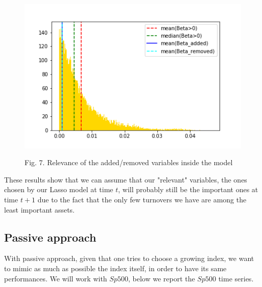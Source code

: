 \documentclass{article}%
\begin{document}
\begin{figure}[h!]
  \centering
  \includegraphics[scale=0.6]{turnover.png}
  \begin{center}
\begin{small}
Fig. 7. Relevance of the added/removed variables inside the model
\end{small}
\end{center}
  \label{turnover}
\end{figure}
These results show that we can assume that our "relevant" variables, the ones chosen by our Lasso model at time $t$, will probably still be the important ones at time $t+1$ due to the fact that the only few turnovers we have are among the least important assets.


\subsection{Passive approach}

With passive approach, given that one tries to choose a growing index, we want to mimic as much as possible the index itself, in order to have its same performances.
We will work with $Sp500$, below we report the $Sp500$ time series.
\\
\end{document}
